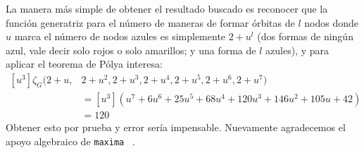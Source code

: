   La manera más simple de obtener el resultado buscado
  es reconocer que la función generatriz%
  para el número de maneras de formar órbitas de \(l\) nodos
  donde \(u\) marca el número de nodos azules
  es simplemente \(2 + u^l\)
  (dos formas de ningún azul,
   vale decir solo rojos o solo amarillos;
   y una forma de \(l\) azules),
  y para aplicar el teorema de Pólya interesa:
  \begin{align*}
    \left[ u^3 \right] \zeta_G(2 + u,
	       &  2 + u^2,
		  2 + u^3,
		  2 + u^4,
		  2 + u^5,
		  2 + u^6,
		  2 + u^7) \\
      &= \left[ u^3 \right] \left(
		 u^7
		   +   6 u^6
		   +  25 u^5
		   +  68 u^4
		   + 120 u^3
		   + 146 u^2
		   + 105 u
		   +  42
		 \right) \\
       &= 120
  \end{align*}
  Obtener esto por prueba y error sería impensable.
  Nuevamente agradecemos el apoyo algebraico
  de \texttt{maxima}~%
    \cite{maxima14b:_computer_algebra}.%

